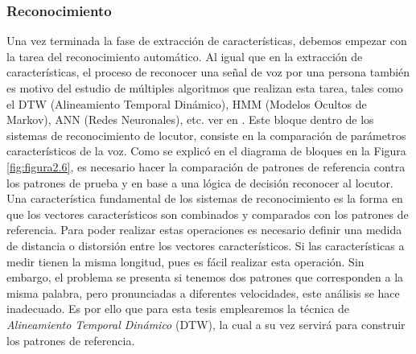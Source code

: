 \subsubsection{Reconocimiento}
Una vez terminada la fase de extracción de características, debemos empezar con la tarea del reconocimiento automático. Al igual que en la extracción de características, el proceso de reconocer una señal de voz por una persona también es motivo del estudio de múltiples algoritmos que realizan esta tarea, tales como el DTW (Alineamiento Temporal Dinámico), HMM (Modelos Ocultos de Markov), ANN (Redes Neuronales), etc. ver en \citep{luna}.
\vskip 0.5cm
Este bloque dentro de los sistemas de reconocimiento de locutor, consiste en la comparación de parámetros característicos de la voz. Como se explicó en el diagrama de bloques en la Figura \ref{fig:figura2.6}, es necesario hacer la comparación de patrones de referencia contra los patrones de prueba y en base a una lógica de decisión reconocer al locutor.
\vskip 0.5cm
Una característica fundamental de los sistemas de reconocimiento es la forma en que los vectores característicos son combinados y comparados con los patrones de referencia. Para poder realizar estas operaciones es necesario definir una medida de distancia o distorsión entre los vectores característicos. Si las características a medir tienen la misma longitud, pues es fácil realizar esta operación. Sin embargo, el problema se presenta si tenemos dos patrones que corresponden a la misma palabra, pero pronunciadas a diferentes velocidades, este análisis se hace inadecuado. Es por ello que para esta tesis emplearemos la técnica de \textit{Alineamiento Temporal Dinámico} (DTW), la cual a su vez servirá para construir los patrones de referencia.
\newpage
